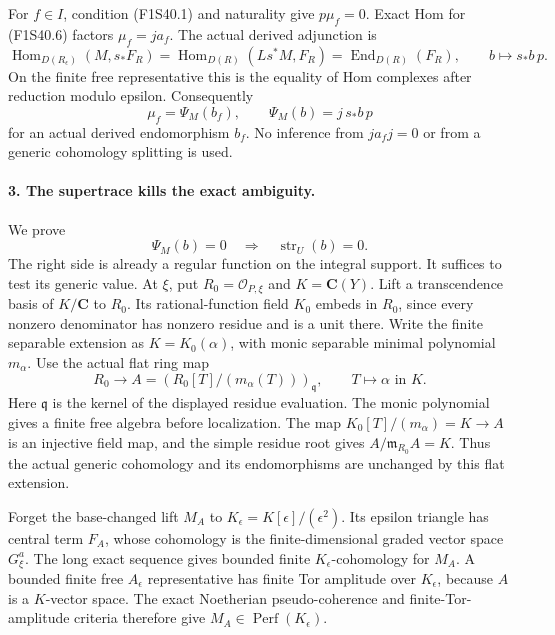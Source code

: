 For $f\in I$, condition (F1S40.1) and naturality give
$p\mu_f=0$. Exact Hom for (F1S40.6) factors
$\mu_f=j a_f$. The actual derived adjunction is
\[
 \operatorname{Hom}_{D(R_\epsilon)}(M,s_*F_R)
   =\operatorname{Hom}_{D(R)}(Ls^*M,F_R)
   =\operatorname{End}_{D(R)}(F_R),
 \qquad b\longmapsto s_*b\,p.
 \tag{F1S40.7}
\]
On the finite free representative this is the equality
of Hom complexes after reduction modulo epsilon.
Consequently
\[
          \mu_f=\Psi_M(b_f),\qquad
          \Psi_M(b)=j\,s_*b\,p
 \tag{F1S40.8}
\]
for an actual derived endomorphism $b_f$.
No inference from $j a_fj=0$ or from a generic
cohomology splitting is used.

\paragraph{3. The supertrace kills the exact ambiguity.}
We prove
\[
          \Psi_M(b)=0\quad\Longrightarrow\quad
                         \operatorname{str}_U(b)=0.
 \tag{F1S40.9}
\]
The right side is already a regular function on the
integral support. It suffices to test its generic value.
At $\xi$, put $R_0=\mathcal O_{P,\xi}$ and
$K=\mathbf C(Y)$. Lift a transcendence basis of
$K/\mathbf C$ to $R_0$. Its rational-function field
$K_0$ embeds in $R_0$, since every nonzero denominator
has nonzero residue and is a unit there. Write the
finite separable extension as $K=K_0(\alpha)$, with
monic separable minimal polynomial $m_\alpha$.
Use the actual flat ring map
\[
 R_0\longrightarrow A=
       (R_0[T]/(m_\alpha(T)))_{\mathfrak q},
 \qquad T\longmapsto\alpha\text{ in }K.
 \tag{F1S40.10}
\]
Here $\mathfrak q$ is the kernel of the displayed
residue evaluation. The monic polynomial gives a
finite free algebra before localization. The map
$K_0[T]/(m_\alpha)=K\to A$ is an injective field
map, and the simple residue root gives
$A/\mathfrak m_{R_0}A=K$.
Thus the actual generic cohomology and its
endomorphisms are unchanged by this flat extension.

Forget the base-changed lift $M_A$ to
$K_\epsilon=K[\epsilon]/(\epsilon^2)$.
Its epsilon triangle has central term $F_A$, whose
cohomology is the finite-dimensional graded vector
space $G^a_\xi$. The long exact sequence gives
bounded finite $K_\epsilon$-cohomology for $M_A$.
A bounded finite free $A_\epsilon$ representative
has finite Tor amplitude over $K_\epsilon$,
because $A$ is a $K$-vector space. The exact
Noetherian pseudo-coherence and finite-Tor-amplitude
criteria therefore give
$M_A\in\operatorname{Perf}(K_\epsilon)$.

